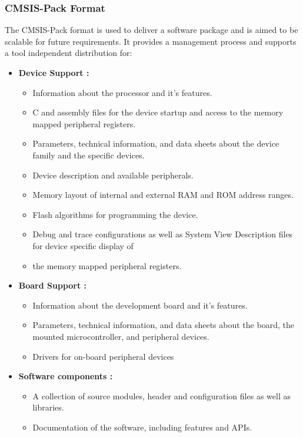 \subsubsection{CMSIS-Pack Format}
The CMSIS-Pack format is used to deliver a software package and is aimed to be scalable for future requirements. It provides a management process and supports a tool independent distribution for:
\begin{itemize}
    \item \textbf{Device Support :}
    \begin{itemize}
        \item Information about the processor and it's features.
        \item C and assembly files for the device startup and access to the memory mapped peripheral registers.
        \item Parameters, technical information, and data sheets about the device family and the specific devices.
        \item Device description and available peripherals.
        \item Memory layout of internal and external RAM and ROM address ranges.
        \item Flash algorithms for programming the device.
        \item Debug and trace configurations as well as System View Description files for device specific display of 
        \item the memory mapped peripheral registers.
    \end{itemize}
    \item \textbf{Board Support :}
    \begin{itemize}
        \item Information about the development board and it's features.
        \item Parameters, technical information, and data sheets about the board, the mounted microcontroller, and peripheral devices.
        \item Drivers for on-board peripheral devices
    \end{itemize}
    \item \textbf{Software components :}
    \begin{itemize}
        \item A collection of source modules, header and configuration files as well as libraries.
        \item Documentation of the software, including features and APIs.
    \end{itemize}
\end{itemize}

